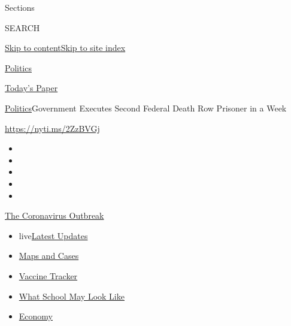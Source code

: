 Sections

SEARCH

\protect\hyperlink{site-content}{Skip to
content}\protect\hyperlink{site-index}{Skip to site index}

\href{https://www.nytimes.com/section/politics}{Politics}

\href{https://myaccount.nytimes.com/auth/login?response_type=cookie\&client_id=vi}{}

\href{https://www.nytimes.com/section/todayspaper}{Today's Paper}

\href{/section/politics}{Politics}\textbar{}Government Executes Second
Federal Death Row Prisoner in a Week

\url{https://nyti.ms/2ZzBVGj}

\begin{itemize}
\item
\item
\item
\item
\item
\end{itemize}

\href{https://www.nytimes.com/news-event/coronavirus?action=click\&pgtype=Article\&state=default\&region=TOP_BANNER\&context=storylines_menu}{The
Coronavirus Outbreak}

\begin{itemize}
\tightlist
\item
  live\href{https://www.nytimes.com/2020/08/01/world/coronavirus-covid-19.html?action=click\&pgtype=Article\&state=default\&region=TOP_BANNER\&context=storylines_menu}{Latest
  Updates}
\item
  \href{https://www.nytimes.com/interactive/2020/us/coronavirus-us-cases.html?action=click\&pgtype=Article\&state=default\&region=TOP_BANNER\&context=storylines_menu}{Maps
  and Cases}
\item
  \href{https://www.nytimes.com/interactive/2020/science/coronavirus-vaccine-tracker.html?action=click\&pgtype=Article\&state=default\&region=TOP_BANNER\&context=storylines_menu}{Vaccine
  Tracker}
\item
  \href{https://www.nytimes.com/interactive/2020/07/29/us/schools-reopening-coronavirus.html?action=click\&pgtype=Article\&state=default\&region=TOP_BANNER\&context=storylines_menu}{What
  School May Look Like}
\item
  \href{https://www.nytimes.com/live/2020/07/31/business/stock-market-today-coronavirus?action=click\&pgtype=Article\&state=default\&region=TOP_BANNER\&context=storylines_menu}{Economy}
\end{itemize}

